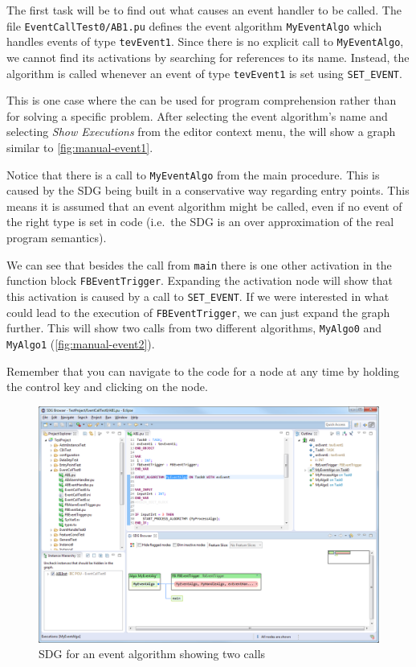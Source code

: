 The first task will be to find out what causes an event handler to be called. The file \texttt{EventCallTest0/AB1.pu} 
defines the event algorithm \lstinline|MyEventAlgo| which handles events of type \lstinline|tevEvent1|. Since there is 
no explicit call to \lstinline|MyEventAlgo|, we cannot find its activations by searching for references to its name. 
Instead, the algorithm is called whenever an event of type \lstinline|tevEvent1| is set using \lstinline|SET_EVENT|. 

This is one case where the \SB can be used for program comprehension rather than for solving a specific problem. After 
selecting the event algorithm's name and selecting \emph{Show Executions} from the editor context menu, the \SB will 
show a graph similar to \autoref{fig:manual-event1}.

Notice that there is a call to \lstinline|MyEventAlgo| from the main procedure. This is caused by the SDG being built 
in a conservative way regarding entry points. This means it is assumed that an event algorithm might be called, even if 
no event of the right type is set in code (i.e.\ the SDG is an over approximation of the real program semantics).

We can see that besides the call from \lstinline|main| there is one other activation in the function block 
\lstinline|FBEventTrigger|. Expanding the activation node will show that this activation is caused by a call to 
\lstinline|SET_EVENT|. If we were interested in what could lead to the execution of \lstinline|FBEventTrigger|, we can 
just expand the graph further. This will show two calls from two different algorithms, \lstinline|MyAlgo0| and 
\lstinline|MyAlgo1| (\autoref{fig:manual-event2}).

Remember that you can navigate to the code for a node at any time by holding the control key and clicking on the node.

\begin{figure}[p]
  \centering
    \includegraphics[width=\textwidth]{bilder/manual-event1}
  \caption{SDG for an event algorithm showing two calls}
  \label{fig:manual-event1}
\end{figure}

